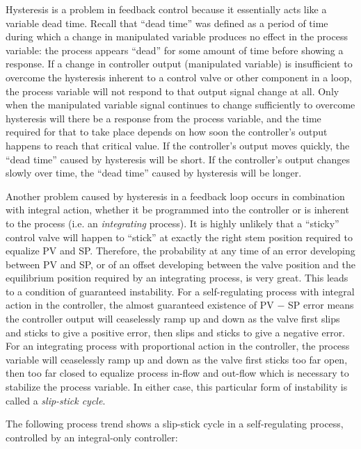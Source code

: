 \vskip 10pt

Hysteresis is a problem in feedback control because it essentially acts like a variable dead time.  Recall that ``dead time'' was defined as a period of time during which a change in manipulated variable produces no effect in the process variable: the process appears ``dead'' for some amount of time before showing a response.  If a change in controller output (manipulated variable) is insufficient to overcome the hysteresis inherent to a control valve or other component in a loop, the process variable will not respond to that output signal change at all.  Only when the manipulated variable signal continues to change sufficiently to overcome hysteresis will there be a response from the process variable, and the time required for that to take place depends on how soon the controller's output happens to reach that critical value.  If the controller's output moves quickly, the ``dead time'' caused by hysteresis will be short.  If the controller's output changes slowly over time, the ``dead time'' caused by hysteresis will be longer.

Another problem caused by hysteresis in a feedback loop occurs in combination with integral action, whether it be programmed into the controller or is inherent to the process (i.e. an \textit{integrating} process).  It is highly unlikely that a ``sticky'' control valve will happen to ``stick'' at exactly the right stem position required to equalize PV and SP.  Therefore, the probability at any time of an error developing between PV and SP, or of an offset developing between the valve position and the equilibrium position required by an integrating process, is very great.  This leads to a condition of guaranteed instability.  For a self-regulating process with integral action in the controller, the almost guaranteed existence of PV $-$ SP error means the controller output will ceaselessly ramp up and down as the valve first slips and sticks to give a positive error, then slips and sticks to give a negative error.  For an integrating process with proportional action in the controller, the process variable will ceaselessly ramp up and down as the valve first sticks too far open, then too far closed to equalize process in-flow and out-flow which is necessary to stabilize the process variable.  In either case, this particular form of instability is called a \textit{slip-stick cycle}.  

The following process trend shows a slip-stick cycle in a self-regulating process, controlled by an integral-only controller:

